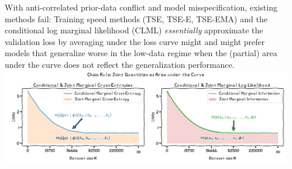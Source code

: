 \documentclass[25pt,a0paper,landscape]{tikzposter}
\begin{document}
\begin{columns}
{{        With anti-correlated prior-data conflict and model misspecification, existing methods fail:
        Training speed methods (TSE, TSE-E, TSE-EMA) \citep{lyle2020bayesian,ru2021speedy} and the conditional log marginal likelihood (CLML) \citep{fong2020marginal,lotfi2022bayesian} \emph{essentially} approximate the validation loss by averaging under the loss curve might and might prefer models that generalize worse in the low-data regime when the (partial) area under the curve does not reflect the generalization performance.
        \includegraphics[width=\linewidth]{area_under_curve_1.00.png}
    }
  }
  {
    {
      \small
      
      
    }
  }
  \begin{subcolumns}
  \end{subcolumns}
\end{columns}
\end{document}
